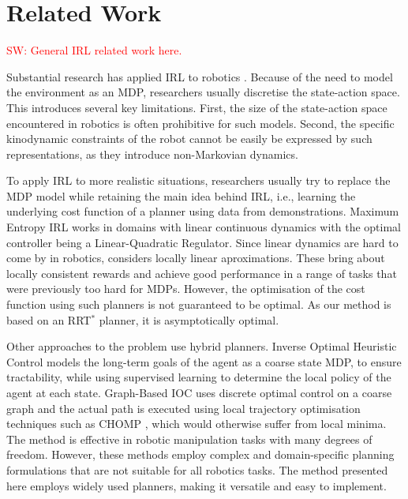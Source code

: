 \documentclass{article}  %
\newcommand{\sw}[1]{\textcolor{red}{SW: #1}}
\newcommand{\ks}[1]{\textcolor{green}{SW: #1}}
\begin{document}
\section{Related Work}

\sw{General IRL related work here.}

Substantial research has applied IRL to robotics \cite{henry2010learning,abbeel2008apprenticeship,vasquez2014inverse}. Because of the need to model the environment as an MDP, researchers usually discretise the state-action space. This introduces several key limitations. First, the size of the state-action space encountered in robotics is often prohibitive for such models. Second, the specific kinodynamic constraints of the robot cannot be easily be expressed by such representations, as they introduce non-Markovian dynamics. 


To apply IRL to more realistic situations, researchers usually try to replace the MDP model while retaining the main idea behind IRL, i.e., learning the underlying cost function of a planner using data from demonstrations. Maximum Entropy IRL \cite{ziebart2010modelingthesis} works in domains with linear continuous dynamics with the optimal controller being a Linear-Quadratic Regulator. Since linear dynamics are hard to come by in robotics, \cite{2012-cioc} considers locally linear aproximations. These bring about locally consistent rewards and achieve good performance in a range of tasks that were previously too hard for MDPs. However, the optimisation of the cost function using such planners is not guaranteed to be optimal. As our method is based on an RRT$^*$ planner, it is asymptotically optimal.

Other approaches to the problem use hybrid planners. Inverse Optimal Heuristic Control \cite{ratliff2009inverse} models the long-term goals of the agent as a coarse state MDP, to ensure tractability, while using supervised learning to determine the local policy of the agent at each state. Graph-Based IOC \cite{byravan2015graph} uses discrete optimal control on a coarse graph and the actual path is executed using local trajectory optimisation techniques such as CHOMP \cite{ratliff2009chomp}, which would otherwise suffer from local minima. The method is effective in robotic manipulation tasks with many degrees of freedom.  However, these methods employ complex and domain-specific planning formulations that are not suitable for all robotics tasks. The method presented here employs widely used planners, making it versatile and easy to implement. 
\end{document}
